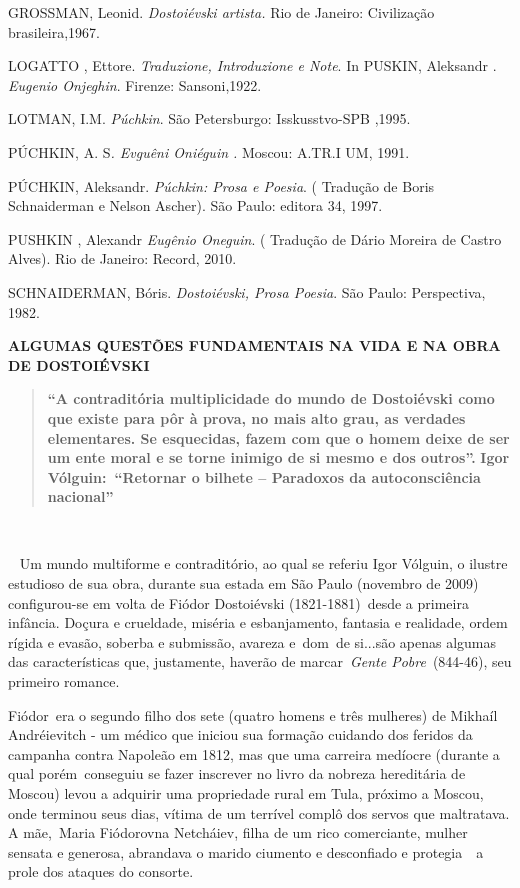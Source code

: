 GROSSMAN, Leonid. \emph{Dostoiévski artista.} Rio de Janeiro:
Civilização brasileira,1967.

LOGATTO , Ettore. \emph{Traduzione, Introduzione e Note}. In PUSKIN,
Aleksandr . \emph{Eugenio Onjeghin}. Firenze: Sansoni,1922.

LOTMAN, I.M. \emph{Púchkin}. São Petersburgo: Isskusstvo-SPB ,1995.

PÚCHKIN, A. S\emph{. Evguêni Oniéguin .} Moscou: A.TR.I UM, 1991.

PÚCHKIN, Aleksandr. \emph{Púchkin: Prosa e Poesia}. ( Tradução de Boris
Schnaiderman e Nelson Ascher). São Paulo: editora 34, 1997.

PUSHKIN , Alexandr \emph{Eugênio Oneguin}. ( Tradução de Dário Moreira
de Castro Alves). Rio de Janeiro: Record, 2010.

SCHNAIDERMAN, Bóris. \emph{Dostoiévski, Prosa Poesia}. São Paulo:
Perspectiva, 1982.

\textbf{ALGUMAS QUESTÕES FUNDAMENTAIS NA VIDA E NA OBRA DE DOSTOIÉVSKI}

\begin{quote}
\textbf{``A contraditória multiplicidade do mundo de Dostoiévski como
que existe para pôr à prova, no mais alto grau, as verdades elementares.
Se esquecidas, fazem com que o homem deixe de ser um ente moral e se
torne inimigo de si mesmo e dos outros''.} \textbf{Igor
Vólguin:~``Retornar o bilhete -- Paradoxos da autoconsciência
nacional''~}
\end{quote}

\textbf{~}

~ Um mundo multiforme e contraditório, ao qual se referiu Igor Vólguin,
o ilustre estudioso de sua obra, durante sua estada em São Paulo
(novembro de 2009) configurou-se em volta de Fiódor Dostoiévski
(1821-1881)~desde a primeira infância. Doçura e crueldade, miséria e
esbanjamento, fantasia e realidade, ordem rígida e evasão, soberba e
submissão, avareza e~dom~de si...são apenas algumas das características
que, justamente, haverão de marcar~\emph{Gente Pobre}~(844-46), seu
primeiro romance.

Fiódor~era o segundo filho dos sete (quatro homens e três mulheres) de
Mikhaíl Andréievitch - um médico que iniciou sua formação cuidando dos
feridos da campanha contra Napoleão em 1812, mas que uma carreira
medíocre (durante a qual porém~conseguiu se fazer inscrever no livro da
nobreza hereditária de Moscou) levou a adquirir uma propriedade rural em
Tula, próximo a Moscou, onde terminou seus dias, vítima de um terrível
complô dos servos que maltratava. A mãe,~Maria Fiódorovna Netcháiev,
filha de um rico comerciante, mulher sensata e generosa, abrandava o
marido ciumento e desconfiado e protegia~~a prole dos ataques do
consorte.

